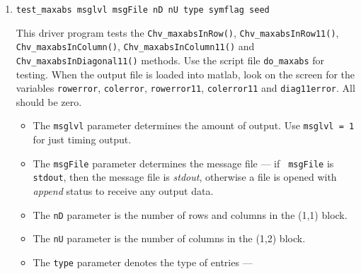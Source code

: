 \begin{enumerate}
\begin{itemize}
{msgFile} is {\tt stdout}, then the message file is {\it stdout},
otherwise a file is opened with {\it append} status to receive any
output data.
\item
The {\tt nD} parameter is the number of rows and columns 
in the (1,1) block.
\item
The {\tt nU} parameter is the number of columns 
in the (1,2) block.
\item
The {\tt type} parameter denotes the type of entries ---
{\tt SPOOLES\_REAL} or {\tt SPOOLES\_COMPLEX} 
\item
The {\tt symflag} parameter is the symmetry flag ---
{\tt SPOOLES\_SYMMETRIC}, {\tt SPOOLES\_HERMITIAN}
or {\tt SPOOLES\_NONSYMMETRIC}.
\item
The {\tt seed} parameter is a random number seed.
\item
The {\tt tau} parameter is used when pivoting is enabled.
All entries in $L$ and $U$ will have magnitudes less than {\tt tau}.
\end{itemize}
\item
\begin{verbatim}
test_maxabs msglvl msgFile nD nU type symflag seed 
\end{verbatim}
This driver program tests the 
{\tt Chv\_maxabsInRow()},
{\tt Chv\_maxabsInRow11()},
{\tt Chv\_maxabsInColumn()},
{\tt Chv\_maxabsInColumn11()} and
{\tt Chv\_maxabsInDiagonal11()} 
methods.
Use the script file {\tt do\_maxabs} for testing.
When the output file is loaded into matlab,
look on the screen for the variables
{\tt rowerror}, {\tt colerror},
{\tt rowerror11}, {\tt colerror11}
and {\tt diag11error}.
All should be zero.
\par
\begin{itemize}
\item
The {\tt msglvl} parameter determines the amount of output.
Use {\tt msglvl = 1} for just timing output.
\item
The {\tt msgFile} parameter determines the message file --- if {\tt
msgFile} is {\tt stdout}, then the message file is {\it stdout},
otherwise a file is opened with {\it append} status to receive any
output data.
\item
The {\tt nD} parameter is the number of rows and columns 
in the (1,1) block.
\item
The {\tt nU} parameter is the number of columns 
in the (1,2) block.
\item
The {\tt type} parameter denotes the type of entries ---

\end{itemize}
\end{enumerate}

